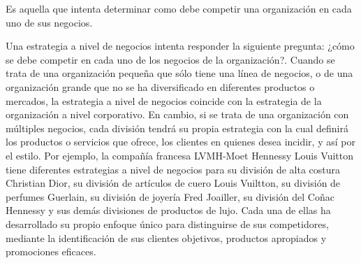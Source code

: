 \begin{enumerate}
\begin{itemize}
		Es aquella que intenta determinar como debe competir una organizaci\'on en cada uno de sus negocios.
	
		 Una estrategia a nivel de negocios intenta responder la siguiente pregunta: ¿c\'omo se debe competir en cada uno de los negocios
de la organizaci\'on?. Cuando se trata de una organizaci\'on peque\~na que s\'olo tiene una l\'inea de negocios, o de una organizaci\'on
grande que no se ha diversificado en diferentes productos o mercados, la estrategia a nivel de negocios coincide con la estrategia de
la organizaci\'on a nivel corporativo. En cambio, si se trata de una organizaci\'on con m\'ultiples negocios, cada divisi\'on tendr\'a su propia
estrategia con la cual definir\'a los productos o servicios que ofrece, los clientes en quienes desea incidir, y as\'i por el estilo. Por
ejemplo, la compa\~n\'ia francesa LVMH-Moet Hennessy Louis Vuitton tiene diferentes estrategias a nivel de negocios para su divisi\'on
de alta costura Christian Dior, su divisi\'on de art\'iculos de cuero Louis Vuiltton, su divisi\'on de perfumes Guerlain, su divisi\'on de joyer\'ia
Fred Joailler, su divisi\'on del Co\~nac Hennessy y sus dem\'as divisiones de productos de lujo. Cada una de ellas ha desarrollado su
propio enfoque \'unico para distinguirse de sus competidores, mediante la identificaci\'on de sus clientes objetivos, productos
apropiados y promociones eficaces.


\end{itemize}
\end{enumerate}
